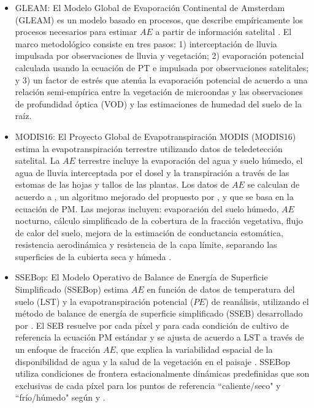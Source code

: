 \documentclass[12pt]{article}
\begin{document}
\begin{itemize}
	\item GLEAM: El Modelo Global de Evaporación Continental de Amsterdam (GLEAM) es un modelo basado en procesos, que describe empíricamente los procesos necesarios para estimar $AE$ a partir de información satelital \citep{Martens2017}. El marco metodológico consiste en tres pasos: 1) interceptación de lluvia impulsada por observaciones de lluvia y vegetación; 2) evaporación potencial calculada usando la ecuación de PT e impulsada por observaciones satelitales; y 3) un factor de estrés que atenúa la evaporación potencial de acuerdo a una relación semi-empírica entre la vegetación de microondas y las observaciones de profundidad óptica (VOD) y las estimaciones de humedad del suelo de la raíz. %
	
	\item MODIS16: El Proyecto Global de Evapotranspiración MODIS (MODIS16) estima la evapotranspiración terrestre utilizando datos de teledetección satelital. La $AE$ terrestre incluye la evaporación del agua y suelo húmedo, el agua de lluvia interceptada por el dosel y la transpiración a través de las estomas de las hojas y tallos de las plantas. Los datos de $AE$ se calculan de acuerdo a \citet{mu2013modis}, un algoritmo mejorado del propuesto por \citet{mu2007development}, y que se basa en la ecuación de PM. Las mejoras incluyen: evaporación del suelo húmedo, $AE$ nocturno, cálculo simplificado de la cobertura de la fracción vegetativa, flujo de calor del suelo, mejora de la estimación de conductancia estomática, resistencia aerodinámica y resistencia de la capa límite, separando las superficies de la cubierta seca y húmeda \citep{mu2013modis}.
	
	\item SSEBop: El Modelo Operativo de Balance de Energía de Superficie Simplificado (SSEBop) estima $AE$ en función de datos de temperatura del suelo (LST) y la evapotranspiración potencial ($PE$) de reanálisis, utilizando el método de balance de energía de superficie simplificado (SSEB) desarrollado por \citet{senay2007coupled,senay2011enhancing}. El SEB resuelve por cada píxel y para cada condición de cultivo de referencia la ecuación PM estándar y se ajusta de acuerdo a LST a través de un enfoque de fracción $AE$, que explica la variabilidad espacial de la disponibilidad de agua y la salud de la vegetación en el paisaje \citep{savoca2013actual}. SSEBop utiliza condiciones de frontera estacionalmente dinámicas predefinidas que son exclusivas de cada píxel para los puntos de referencia ``caliente/seco" y ``frío/húmedo" según \citet{bastiaanssen2014earth} y \citet{allen2007satellite}.
	

\end{itemize}
\end{document}
